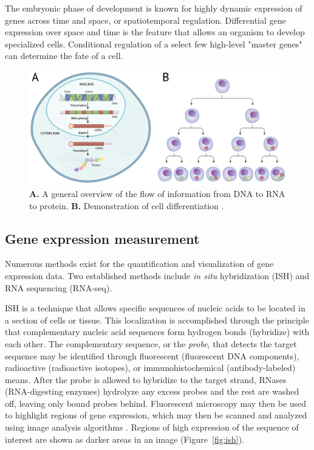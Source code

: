 \documentclass[12pt,oneside,onecolumn,a4paper]{article}
\begin{document}
The embryonic phase of development is known for highly dynamic expression of genes across time and space, or spatiotemporal regulation. Differential gene expression over space and time is the feature that allows an organism to develop specialized cells. Conditional regulation of a select few high-level "master genes" can determine the fate of a cell. 
\citep{bisceglia_2010}

\begin{figure}[h!]
\begin{center}
\includegraphics[width=0.8\columnwidth]{figures/dna_flow}
\caption{\textbf{A.} A general overview of the flow of information from DNA to RNA to protein. \textbf{B.} Demonstration of cell differentiation \citep{bisceglia_2010}.%
}
\end{center}
\end{figure}

\subsection{Gene expression measurement}
Numerous methods exist for the quantification and visualization of gene expression data. Two established methods include \textit{in situ} hybridization (ISH) and RNA sequencing (RNA-seq). 

ISH is a technique that allows specific sequences of nucleic acids to be located in a section of cells or tissue. This localization is accomplished through the principle that complementary nucleic acid sequences form hydrogen bonds (hybridize) with each other. The complementary sequence, or the \textit{probe}, that detects the target sequence may be identified through fluorescent (fluorescent DNA components), radioactive (radioactive isotopes), or immunohistochemical (antibody-labeled) means. After the probe is allowed to hybridize to the target strand, RNases (RNA-digesting enzymes) hydrolyze any excess probes and the rest are washed off, leaving only bound probes behind. Fluorescent microscopy may then be used to highlight regions of gene expression, which may then be scanned and analyzed using image analysis algorithms \citep{Angerer_1991}. Regions of high expression of the sequence of interest are shown as darker areas in an image (Figure~\ref{fig:ish}). 
\end{document}
